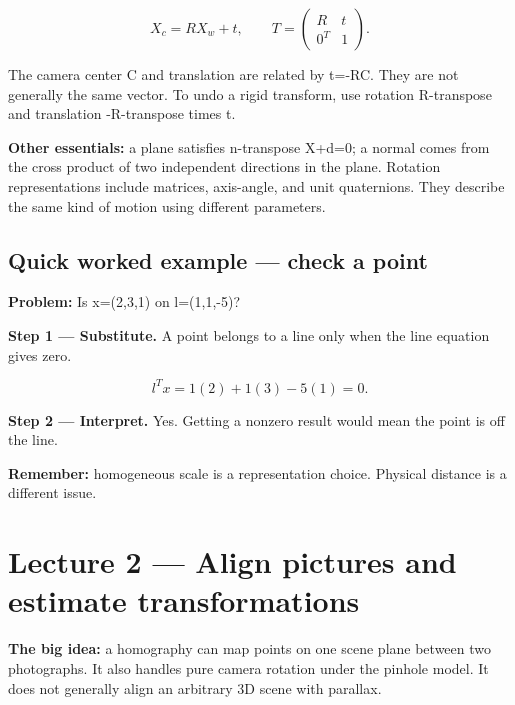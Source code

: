 \documentclass[11pt,letterpaper]{article}
\begin{document}
\begin{tcolorbox}\color{MathBlue}\[X_c=RX_w+t, \qquad T=\begin{pmatrix}R&t\\0^T&1\end{pmatrix}.\]\end{tcolorbox}


The camera center C and translation are related by t=-RC. They are not generally the same vector. To undo a rigid transform, use rotation R-transpose and translation -R-transpose times t.



\textbf{Other essentials:} a plane satisfies n-transpose X+d=0; a normal comes from the cross product of two independent directions in the plane. Rotation representations include matrices, axis-angle, and unit quaternions. They describe the same kind of motion using different parameters.



\subsection*{Quick worked example — check a point}


\textbf{Problem:} Is x=(2,3,1) on l=(1,1,-5)?



\textcolor{StepRed}{\textbf{Step 1 — Substitute.} A point belongs to a line only when the line equation gives zero.}



\begin{tcolorbox}\color{MathBlue}\[l^Tx=1(2)+1(3)-5(1)=0.\]\end{tcolorbox}


\textcolor{StepRed}{\textbf{Step 2 — Interpret.} Yes. Getting a nonzero result would mean the point is off the line.}



\textbf{Remember:} homogeneous scale is a representation choice. Physical distance is a different issue.



\section*{Lecture 2 — Align pictures and estimate transformations}


\textbf{The big idea:} a homography can map points on one scene plane between two photographs. It also handles pure camera rotation under the pinhole model. It does not generally align an arbitrary 3D scene with parallax.
\end{document}

